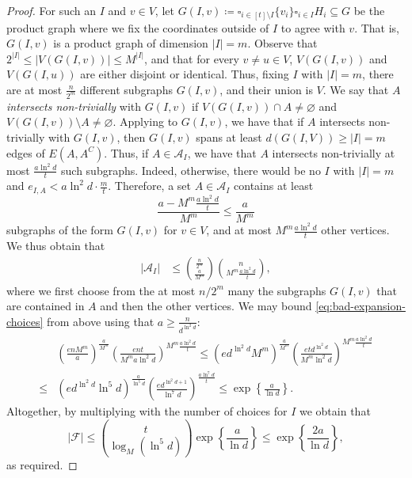 \documentclass[10pt,a4paper]{amsart}
\begin{document}
\begin{proof}
For such an $I$ and $v\in V$, let $G(I,v)\coloneqq \square_{i\in [t]\setminus I}\{v_i\} \square_{i\in I}H_i\subseteq G$ be the product graph where we fix the coordinates outside of $I$ to agree with $v$. That is, $G(I, v)$ is a product graph of dimension $|I|=m$. Observe that $2^{|I|}\le|V(G(I,v))|\le M^{|I|}$, and that for every $v\neq u\in V$, $V(G(I,v))$ and $V(G(I,u))$ are either disjoint or identical. Thus, fixing $I$ with $|I|=m$, there are at most $\frac{n}{2^m}$ different subgraphs $G(I,v)$, and their union is $V$. We say that $A$ \textit{intersects non-trivially} with $G(I,v)$ if $V(G(I,v))\cap A\neq \varnothing$ and $V(G(I,v))\setminus A\neq \varnothing$.
Applying  to $G(I, v)$, we have that if $A$ intersects non-trivially with $G(I,v)$, then $G(I,v)$ spans at least $d(G(I, V)) \geq |I|=m$ edges of $E(A,A^C)$. Thus, if $A\in \mathcal{A}_I$, we have that $A$ intersects non-trivially at most $\frac{a\ln^2d}{t}$ such subgraphs. Indeed, otherwise, there would be no $I$ with $|I|=m$ and $e_{I,A}<a\ln^2d\cdot \frac{m}{t}$. Therefore, a set $A\in \mathcal{A}_I$ contains at least $$\frac{a-M^m\frac{a\ln^2d}{t}}{M^m} \leq \frac{a}{M^m}$$ subgraphs of the form $G(I, v)$ for $v \in V$, and at most $M^m\frac{a\ln^2d}{t}$ other vertices. We thus obtain that
\begin{align} \label{eq:bad-expansion-choices}
    |\mathcal{A}_I|&\le \binom{\frac{n}{2^m}}{\frac{a}{M^m}}\binom{n}{M^m\frac{a\ln^2d}{t}},
\end{align}
where we first choose from the at most $n/2^m$ many the subgraphs $G(I, v)$ that are contained in $A$ and then the other vertices.
We may bound \eqref{eq:bad-expansion-choices} from above using that $a \geq \frac{n}{d^{\ln^2 d}}$:
\begin{align*}
    &\left(\frac{enM^m}{a}\right)^{\frac{a}{M^m}}\left(\frac{ent}{M^m a\ln^2d}\right)^{M^m\frac{a\ln^2d}{t}}
    \le \left(ed^{\ln^2d}M^m\right)^{\frac{a}{M^m}}\left(\frac{etd^{\ln^2d}}{M^m\ln^2d}\right)^{M^m\frac{a\ln^2d}{t}}\\
    \le&\left(ed^{\ln^2d}\ln^5 d\right)^{\frac{a}{\ln^5d}}\left(\frac{ed^{\ln^2d+1}}{\ln^7d}\right)^{\frac{a\ln^7d}{t}}
    \le \exp\left\{\frac{a}{\ln d}\right\}.
\end{align*}
Altogether, by multiplying with the number of choices for $I$ we obtain that 
\[
|\mathcal{F}|\le \binom{t}{\log_M(\ln^5d)}\exp\left\{\frac{a}{\ln d}\right\}\le \exp\left\{\frac{2a}{\ln d}\right\},
\]
as required.
\end{proof}



\end{document}
